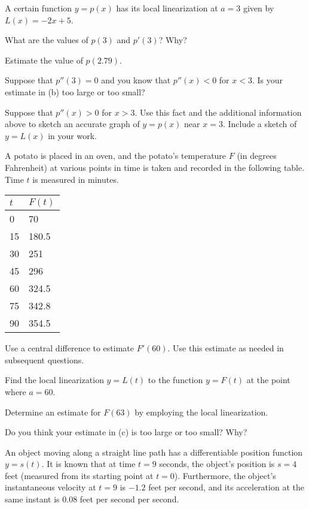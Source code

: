 \begin{exercises} 

\item A certain function $y=p(x)$ has its local linearization at $a = 3$ given by $L(x) = -2x + 5$.

\ba
	\item What are the values of $p(3)$ and $p'(3)$?  Why?
	\item Estimate the value of $p(2.79)$.
	\item Suppose that $p''(3) = 0$ and you know that $p''(x) < 0$ for $x < 3$.  Is your estimate in (b) too large or too small?
	\item Suppose that $p''(x) > 0$ for $x > 3$.  Use this fact and the additional information above to sketch an accurate graph of $y = p(x)$ near $x = 3$.  Include a sketch of $y = L(x)$ in your work.
\ea

\item A potato is placed in an oven, and the potato's temperature $F$ (in degrees Fahrenheit) at various points in time is taken and recorded in the following table. Time $t$ is measured in minutes.

\begin{tabular}{| l || l |}
\hline
$t$ & $F(t)$ \\ \hline \hline
0 & 70\\ \hline
15 & 180.5 \\ \hline
30 & 251 \\ \hline
45 & 296 \\ \hline
60 & 324.5 \\ \hline
75 & 342.8 \\ \hline
90 & 354.5  \\ \hline
\end{tabular}

\ba
	\item Use a central difference to estimate $F'(60)$.  Use this estimate as needed in subsequent questions.
	\item Find the local linearization $y = L(t)$ to the function $y = F(t)$ at the point where $a = 60$.
	\item Determine an estimate for $F(63)$ by employing the local linearization.  
	\item Do you think your estimate in (c) is too large or too small?  Why?
\ea

\item An object moving along a straight line path has a differentiable position function $y = s(t)$.  It is known that at time $t = 9$ seconds, the object's position is $s = 4$ feet (measured from its starting point at $t = 0$).  Furthermore, the object's instantaneous velocity at $t = 9$ is $-1.2$ feet per second, and its acceleration at the same instant is $0.08$ feet per second per second.


\end{exercises}
